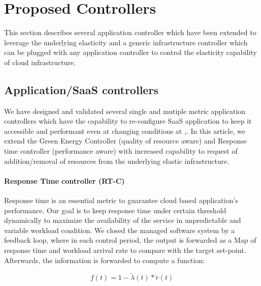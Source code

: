 \section{Proposed Controllers}

This section describes several application controller which have been extended to leverage the underlying elasticity and a generic infrastructure controller which can be plugged with any application controller to control the elasticity capability of cloud infrastructure. 

\subsection{Application/SaaS controllers} \label{saas-controller}


We have designed and validated several single and mutiple metric application controllers which have the capability to re-configure SaaS application to keep it accessible and performant even at changing conditions at \cite{sabbir},\cite{tsc}. In this article, we extend the Green Energy Controller (quality of resource aware) and Response time controller (performance aware) with increased capability to request of addition/removal of resources from the underlying elastic infrastructure.


\paragraph*{\textbf{Response Time controller (RT-C)}}
Response time is an essential metric to guarantee cloud
based application's performance. Our goal is to keep response
time under certain threshold dynamically to maximize the
availability of the service in unpredictable and variable
workload condition. We closed the managed software
system by a feedback loop, where in each control period, the
output is forwarded as a Map of response time and workload
arrival rate to compare with the target set-point. Afterwards, the information is forwarded to compute a function:

\begin{equation}
f(t)=1-\tilde{\lambda}(t)*\tilde{r}(t)
\end{equation} 


